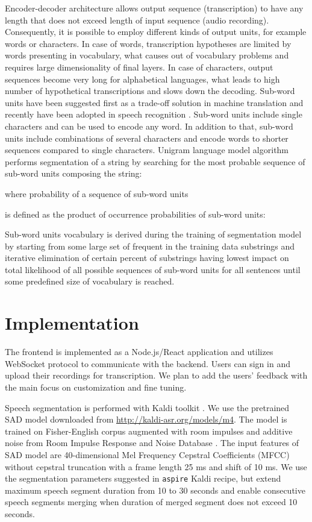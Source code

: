 \documentclass[12pt,a4paper]{article}
\begin{document}
Encoder-decoder architecture allows output sequence (transcription)
to have any length that does not exceed length of input sequence (audio recording).
Consequently, it is possible to employ different kinds of output units,
for example words or characters. In case of words,
transcription hypotheses are limited by words presenting in vocabulary,
what causes out of vocabulary problems and requires
large dimensionality of final layers.
In case of characters, output sequences become very long
for alphabetical languages, what leads to
high number of hypothetical transcriptions
and slows down the decoding.
Sub-word units have been suggested first as a trade-off solution in
machine translation \cite{sennrich2015neural} and recently have been adopted in speech recognition \cite{zeyer2018improved}.
Sub-word units include single characters and can be used to encode
any word. In addition to that, sub-word units include
combinations of several characters and encode
words to shorter sequences compared to single characters.
Unigram language model algorithm \cite{kudo2018subword}
performs segmentation of a string  by searching for the most
probable sequence of sub-word units composing the string:

where probability  of a sequence of sub-word units

is defined as the product of occurrence probabilities of sub-word
units:

Sub-word units vocabulary  is derived during
the training of segmentation model by starting
from some large set of frequent in the training data
substrings and iterative
elimination of certain percent of substrings having
lowest impact on total likelihood of all possible
sequences of sub-word units for all sentences 
until some predefined size of vocabulary is reached.

\section{Implementation}

The frontend is implemented as a Node.js/React application and utilizes WebSocket protocol
to communicate with the backend. Users can sign in and upload their recordings for transcription. 
We plan to add the users' feedback with the main focus on customization and fine tuning. 

Speech segmentation is performed with Kaldi toolkit \cite{povey2011kaldi}.
We use the pretrained SAD model downloaded from \url{http://kaldi-asr.org/models/m4}.
The model is trained on Fisher-English corpus \cite{cieri2004fisher}
augmented with room impulses and additive noise from
Room Impulse Response and Noise Database \cite{ko2017study}.
The input features of SAD model
are 40-dimensional Mel Frequency Cepstral Coefficients (MFCC) without cepstral truncation
with a frame length 25 ms and shift of 10 ms.
We use the segmentation parameters suggested in 
\texttt{aspire} Kaldi recipe, but extend maximum speech segment duration
from 10 to 30 seconds and enable consecutive speech segments merging
when duration of merged segment does not exceed 10 seconds.
\end{document}
